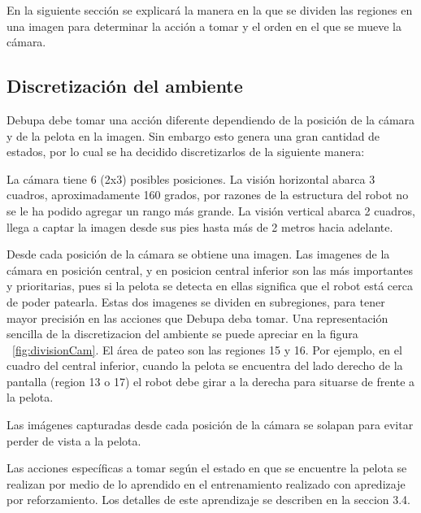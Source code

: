 En la siguiente sección se explicará la manera en la que se dividen las regiones en una imagen para determinar la acción a tomar y el orden en el que se mueve la cámara.

\subsection{Discretización del ambiente}


Debupa debe tomar una acción diferente dependiendo de la posición de la cámara y de la pelota en la imagen. Sin embargo esto genera una gran cantidad de estados, por lo cual se ha decidido discretizarlos de la siguiente manera:  

La cámara tiene 6 (2x3) posibles posiciones. La visión horizontal abarca 3 cuadros, aproximadamente 160 grados, por razones de la estructura del robot no se le ha podido agregar un rango más grande. La visión vertical abarca 2 cuadros, llega a captar la imagen desde sus pies hasta más de 2 metros hacia adelante.

Desde cada posición de la cámara se obtiene una imagen. Las imagenes de la cámara en posición central, y en posicion central inferior son las más importantes y prioritarias, pues si la pelota se detecta en ellas significa que el robot está cerca de poder patearla. Estas dos imagenes se dividen en subregiones, para tener mayor precisión en las acciones que Debupa deba tomar. Una representación sencilla de la discretizacion del ambiente se puede apreciar en la figura ~\ref{fig:divisionCam}. El área de pateo son las regiones 15 y 16. Por ejemplo, en el cuadro del central inferior, cuando la pelota se encuentra del lado derecho de la pantalla (region 13 o 17) el robot debe girar a la derecha para situarse de frente a la pelota.

Las imágenes capturadas desde cada posición de la cámara se solapan para evitar perder de vista a la pelota. 

Las acciones específicas a tomar según el estado en que se encuentre la pelota se realizan por medio de lo aprendido en el entrenamiento realizado con apredizaje por reforzamiento. Los detalles de este aprendizaje se describen en la seccion 3.4.
 


